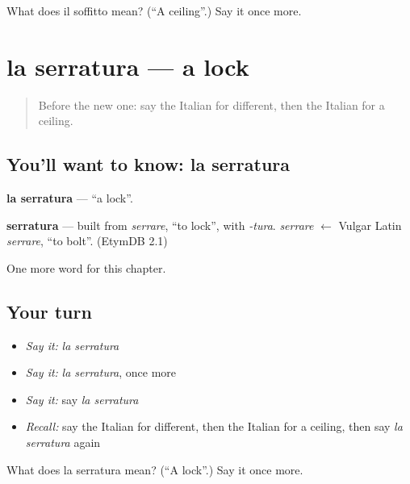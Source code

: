 \begin{tcolorbox}[breakable,colback=teal!4,colframe=teal!35!black,title={Before you move on}]
What does il soffitto mean? (\textquotedblleft{}A ceiling\textquotedblright{}.) Say it once more.
\end{tcolorbox}
\section[la serratura]{la serratura — a lock}

\label{lesson:IT-C191-serratura}



\begin{quote}
Before the new one: say the Italian for different, then the Italian for a ceiling.
\end{quote}

\subsection*{You'll want to know: la serratura}
\textbf{la serratura} — \textquotedblleft{}a lock\textquotedblright{}.

\begin{cousinweb}
\textbf{serratura} — built from \emph{serrare}, \textquotedblleft{}to lock\textquotedblright{}, with \emph{-tura}. \emph{serrare} $\leftarrow$ Vulgar Latin \emph{serrare}, \textquotedblleft{}to bolt\textquotedblright{}. (EtymDB 2.1)
\end{cousinweb}

\begin{grammarlens}[title={What you've built}]
One more word for this chapter.
\end{grammarlens}

\subsection*{Your turn}
\begin{itemize}
\raggedright
  \item \emph{Say it:} \emph{la serratura}
  \item \emph{Say it:} \emph{la serratura}, once more
  \item \emph{Say it:} say \emph{la serratura}
  \item \emph{Recall:} say the Italian for different, then the Italian for a ceiling, then say \emph{la serratura} again
\end{itemize}

\begin{tcolorbox}[breakable,colback=teal!4,colframe=teal!35!black,title={Before you move on}]
What does la serratura mean? (\textquotedblleft{}A lock\textquotedblright{}.) Say it once more.
\end{tcolorbox}
